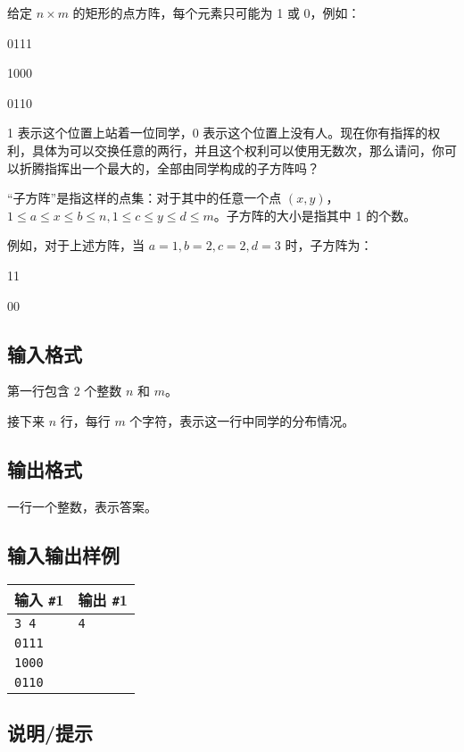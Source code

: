 \documentclass{article}
\begin{document}
	给定 $n\times m$ 的矩形的点方阵，每个元素只可能为 1 或 0，例如：

	\begin{center}
		0111

		1000

		0110
	\end{center}
	
	1 表示这个位置上站着一位同学，0 表示这个位置上没有人。现在你有指挥的权利，具体为可以交换任意的两行，并且这个权利可以使用无数次，那么请问，你可以折腾指挥出一个最大的，全部由同学构成的子方阵吗？
	
	“子方阵”是指这样的点集：对于其中的任意一个点 $(x,y)$，$1\le a\le x\le b\le n,1\le c\le y\le d\le m$。子方阵的大小是指其中 1 的个数。

	例如，对于上述方阵，当 $a=1,b=2,c=2,d=3$ 时，子方阵为：

	\begin{center}
		11

		00
	\end{center}


	\subsection{输入格式}

	第一行包含 2 个整数 $n$ 和 $m$。

	接下来 $n$ 行，每行 $m$ 个字符，表示这一行中同学的分布情况。

	\subsection{输出格式}

	一行一个整数，表示答案。

	\subsection{输入输出样例}

	\begin{tabularx}{\textwidth}{|X|X|}
		\hline
		\textbf{输入 \texttt{\#}1} & \textbf{输出 \texttt{\#}1} \\
		\hline
		\texttt{3 4} & \texttt{4}\\
		\texttt{0111} & \\
		\texttt{1000} & \\
		\texttt{0110} & \\
		\hline
	\end{tabularx}

	\subsection{说明/提示}
\end{document}
